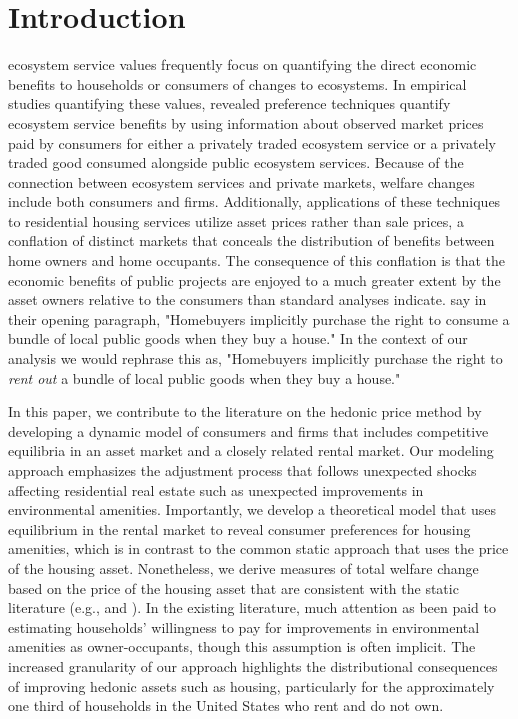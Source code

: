 \documentclass[ecta,nameyear,draft]{econsocart}
\theoremstyle{plain}
\theoremstyle{remark}
\begin{document}
\section{Introduction}

 ecosystem service values frequently focus on quantifying the direct economic benefits to households or consumers of changes to ecosystems. In empirical studies quantifying these values, revealed preference techniques quantify ecosystem service benefits by using information about observed market prices paid by consumers for either a privately traded ecosystem service or a privately traded good consumed alongside public ecosystem services. Because of the connection between ecosystem services and private markets, welfare changes include both consumers and firms. Additionally, applications of these techniques to residential housing services utilize asset prices rather than sale prices, a conflation of distinct markets that conceals the distribution of benefits between home owners and home occupants. The consequence of this conflation is that the economic benefits of public projects are enjoyed to a much greater extent by the asset owners relative to the consumers than standard analyses indicate. \cite{kuminoffpope14} say in their opening paragraph, "Homebuyers implicitly purchase the right to consume a bundle of local public goods when they buy a house." In the context of our analysis we would rephrase this as, "Homebuyers implicitly purchase the right to \textit{rent out} a bundle of local public goods when they buy a house."

In this paper, we contribute to the literature on the hedonic price method by developing a dynamic model of consumers and firms that includes competitive equilibria in an asset market and a closely related rental market. Our modeling approach emphasizes the adjustment process that follows unexpected shocks affecting residential real estate such as unexpected improvements in environmental amenities. Importantly, we develop a theoretical model that uses equilibrium in the rental market to reveal consumer preferences for housing amenities, which is in contrast to the common static approach that uses the price of the housing asset. Nonetheless, we derive measures of total welfare change based on the price of the housing asset that are consistent with the static literature (e.g., \cite{freeman99} and \cite{freeman14}). In the existing literature, much attention as been paid to estimating households' willingness to pay for improvements in environmental amenities as owner-occupants, though this assumption is often implicit. The increased granularity of our approach highlights the distributional consequences of improving hedonic assets such as housing, particularly for the approximately one third of households in the United States who rent and do not own. 
\end{document}
